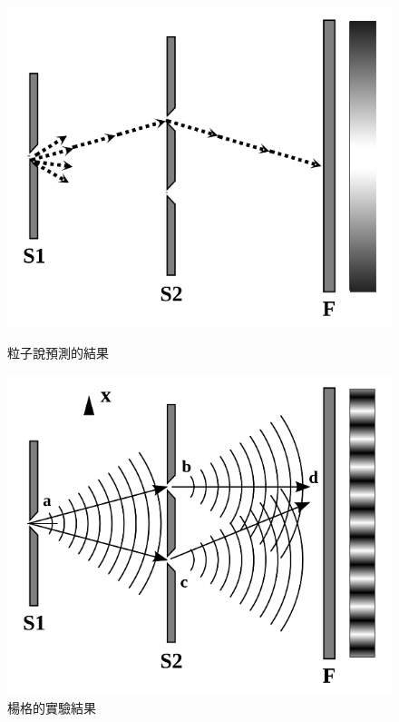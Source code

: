 \begin{figure}[H]
\centering
\begin{minipage}{0.5\textwidth}
\graphicspath{{physics/}}
\includegraphics[width=\linewidth, center]{exp1.png}
\caption{粒子說預測的結果}
\label{fig:exp1}
\end{minipage}%
\begin{minipage}{0.5\textwidth}
\centering
\graphicspath{{physics/}}
\includegraphics[width=\linewidth, center]{exp2.png}
\caption{楊格的實驗結果}
\label{fig:exp2}
\end{minipage}
\end{figure}

